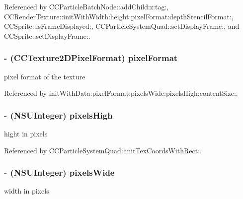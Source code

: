 Referenced by C\-C\-Particle\-Batch\-Node\-::add\-Child\-:z\-:tag\-:, C\-C\-Render\-Texture\-::init\-With\-Width\-:height\-:pixel\-Format\-:depth\-Stencil\-Format\-:, C\-C\-Sprite\-::is\-Frame\-Displayed\-:, C\-C\-Particle\-System\-Quad\-::set\-Display\-Frame\-:, and C\-C\-Sprite\-::set\-Display\-Frame\-:.

\hypertarget{class_c_c_texture2_d_a8c41340ab06df5f92ed08dfae1d52cbf}{
\subsubsection[{pixel\-Format}]{\setlength{\rightskip}{0pt plus 5cm}-\/ (C\-C\-Texture2\-D\-Pixel\-Format) {\bf pixel\-Format}}}\label{class_c_c_texture2_d_a8c41340ab06df5f92ed08dfae1d52cbf}
pixel format of the texture 

Referenced by init\-With\-Data\-:pixel\-Format\-:pixels\-Wide\-:pixels\-High\-:content\-Size\-:.

\hypertarget{class_c_c_texture2_d_ab0589fe4207a83b59b3e3de26bf0de86}{
\subsubsection[{pixels\-High}]{\setlength{\rightskip}{0pt plus 5cm}-\/ (N\-S\-U\-Integer) {\bf pixels\-High}}}\label{class_c_c_texture2_d_ab0589fe4207a83b59b3e3de26bf0de86}
hight in pixels 

Referenced by C\-C\-Particle\-System\-Quad\-::init\-Tex\-Coords\-With\-Rect\-:.

\hypertarget{class_c_c_texture2_d_aa10cf350abdbbf21f079fa1faa4da95a}{
\subsubsection[{pixels\-Wide}]{\setlength{\rightskip}{0pt plus 5cm}-\/ (N\-S\-U\-Integer) {\bf pixels\-Wide}}}\label{class_c_c_texture2_d_aa10cf350abdbbf21f079fa1faa4da95a}
width in pixels 

